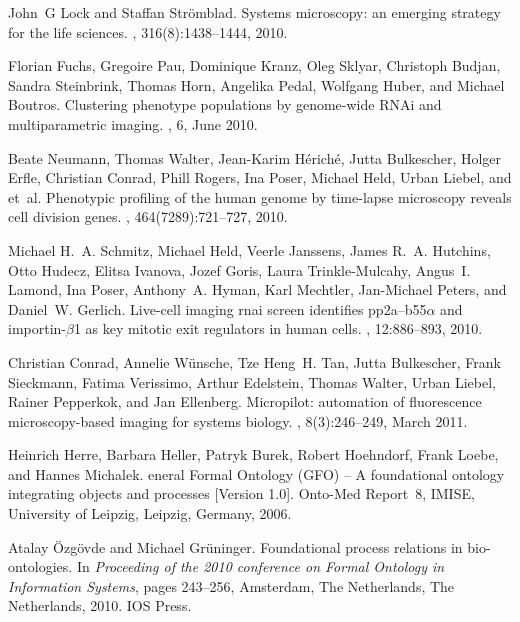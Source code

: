 \documentclass[11pt]{article}
\begin{document}
\begin{thebibliography}{10}
John~G Lock and Staffan Strömblad.
\newblock Systems microscopy: an emerging strategy for the life sciences.
, 316(8):1438--1444, 2010.

Florian Fuchs, Gregoire Pau, Dominique Kranz, Oleg Sklyar, Christoph Budjan,
  Sandra Steinbrink, Thomas Horn, Angelika Pedal, Wolfgang Huber, and Michael
  Boutros.
\newblock Clustering phenotype populations by genome-wide {RNAi} and
  multiparametric imaging.
, 6, June 2010.

Beate Neumann, Thomas Walter, Jean-Karim Hériché, Jutta Bulkescher, Holger
  Erfle, Christian Conrad, Phill Rogers, Ina Poser, Michael Held, Urban Liebel,
  and et~al.
\newblock Phenotypic profiling of the human genome by time-lapse microscopy
  reveals cell division genes.
, 464(7289):721--727, 2010.

Michael H.~A. Schmitz, Michael Held, Veerle Janssens, James R.~A. Hutchins,
  Otto Hudecz, Elitsa Ivanova, Jozef Goris, Laura Trinkle-Mulcahy, Angus~I.
  Lamond, Ina Poser, Anthony~A. Hyman, Karl Mechtler, Jan-Michael Peters, and
  Daniel~W. Gerlich.
\newblock Live-cell imaging rnai screen identifies pp2a–b55$\alpha$ and
  importin-$\beta$1 as key mitotic exit regulators in human cells.
, 12:886--893, 2010.

Christian Conrad, Annelie W\"{u}nsche, Tze Heng~H. Tan, Jutta Bulkescher, Frank
  Sieckmann, Fatima Verissimo, Arthur Edelstein, Thomas Walter, Urban Liebel,
  Rainer Pepperkok, and Jan Ellenberg.
\newblock Micropilot: automation of fluorescence microscopy-based imaging for
  systems biology.
, 8(3):246--249, March 2011.

Heinrich Herre, Barbara Heller, Patryk Burek, Robert Hoehndorf, Frank Loebe,
  and Hannes Michalek.
eneral {F}ormal {O}ntology ({GFO}) -- {A} foundational ontology
  integrating objects and processes [{V}ersion 1.0].
\newblock Onto-Med Report~8, IMISE, University of Leipzig, Leipzig, Germany,
  2006.

Atalay \"{O}zg\"{o}vde and Michael Gr\"{u}ninger.
\newblock Foundational process relations in bio-ontologies.
\newblock In {\em Proceeding of the 2010 conference on Formal Ontology in
  Information Systems}, pages 243--256, Amsterdam, The Netherlands, The
  Netherlands, 2010. IOS Press.


\end{thebibliography}
\end{document}
